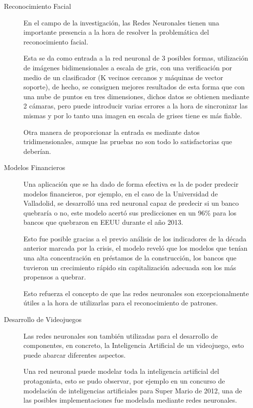 \documentclass[11pt, oneside]{article}   	%
\begin{document}
\begin{description}
  \item[Reconocimiento Facial]
    En el campo de la investigación, las Redes Neuronales tienen una importante presencia a la hora de resolver la problemática del reconocimiento facial.

    Esta se da como entrada a la red neuronal de 3 posibles formas, utilización de imágenes bidimensionales a escala de
    gris, con una verificación por medio de un clasificador (K vecinos cercanos y máquinas de vector soporte), de hecho, se consiguen mejores resultados de esta forma que con una nube de puntos en tres dimensiones, dichos datos se obtienen mediante 2 cámaras, pero puede introducir varias errores a la hora de sincronizar las mismas y por lo tanto una imagen en escala de grises tiene es más fiable.

    Otra manera de proporcionar la entrada es mediante datos tridimensionales, aunque las pruebas no son todo lo satisfactorias que deberían.\\

  \item[Modelos Financieros]
    Una aplicación que se ha dado de forma efectiva es la de poder predecir modelos financieros, por ejemplo, en el caso de
    la Universidad de Valladolid, se desarrolló una red neuronal capaz de predecir si un banco quebraría o no, este modelo
    acertó sus predicciones en un 96\% para los bancos que quebraron en EEUU durante el año 2013.

    Esto fue posible gracias a el previo análisis de los indicadores de la década anterior marcada por la crisis, el modelo reveló que los modelos que tenían una alta concentración en préstamos de la construcción, los bancos que tuvieron un crecimiento rápido sin capitalización adecuada son los más propensos a quebrar.

    Esto refuerza el concepto de que las redes neuronales son excepcionalmente útiles a la hora de utilizarlas para el reconocimiento de patrones.\\

  \item[Desarrollo de Videojuegos]
    Las redes neuronales son también utilizadas para el desarrollo de componentes, en concreto, la Inteligencia Artificial de un videojuego, esto puede abarcar diferentes aspectos.

    Una red neuronal puede modelar toda la inteligencia artificial del protagonista, esto se pudo observar, por ejemplo en un concurso de modelación de inteligencias artificiales para Super Mario de 2012, una de las posibles implementaciones fue modelada mediante redes neuronales.


\end{description}
\end{document}
